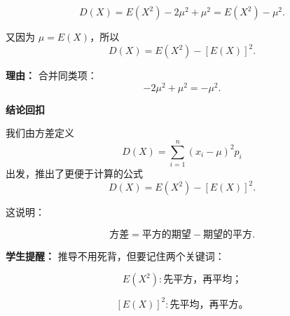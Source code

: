 \begin{proofbox}
\begin{description}[style=nextline, leftmargin=2.8em, labelsep=0.5em, itemsep=0.55em]
		\item[\textbf{步骤五（合并化简）：}]
		      \[
			      D(X)=E(X^2)-2\mu^2+\mu^2
			      =E(X^2)-\mu^2.
		      \]

		      又因为 $\mu=E(X)$，所以
		      \[
			      D(X)=E(X^2)-[E(X)]^2.
		      \]

		      \par\textbf{理由：}
		      合并同类项：
		      \[
			      -2\mu^2+\mu^2=-\mu^2.
		      \]
	\end{description}

	\medskip

	\textbf{\textcolor{CProof}{结论回扣}}

	我们由方差定义
	\[
		D(X)=\sum_{i=1}^{n}(x_i-\mu)^2p_i
	\]
	出发，推出了更便于计算的公式
	\[
		\boxed{D(X)=E(X^2)-[E(X)]^2}.
	\]

	这说明：

	\[
		\text{方差}=\text{平方的期望}-\text{期望的平方}.
	\]

	\textbf{\textcolor{CProof}{学生提醒：}}
	推导不用死背，但要记住两个关键词：

	\[
		E(X^2): \text{先平方，再平均；}
	\]

	\[
		[E(X)]^2: \text{先平均，再平方。}
	\]
\end{proofbox}